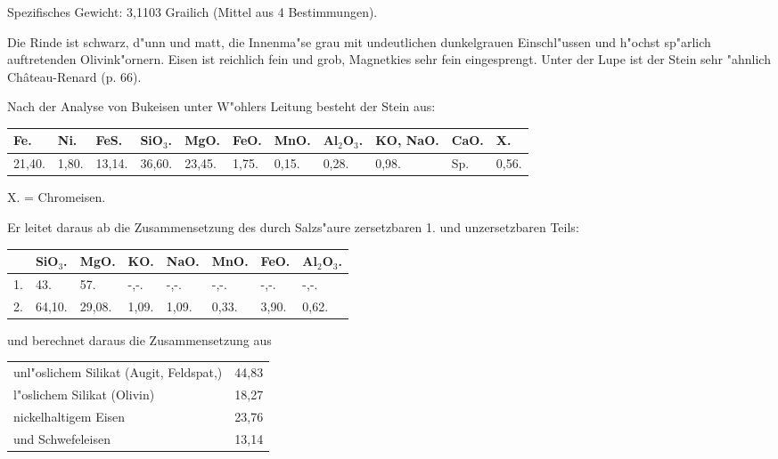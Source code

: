 \documentclass[a4paper, 11pt, oneside]{article}
\begin{document}
Spezifisches Gewicht: 3,1103 Grailich (Mittel aus 4 Bestimmungen).

Die Rinde ist schwarz, d"unn und matt, die Innenma"se grau mit undeutlichen dunkelgrauen Einschl"ussen und h"ochst sp"arlich auftretenden Olivink"ornern. Eisen ist reichlich fein und grob, Magnetkies sehr fein eingesprengt. Unter der Lupe ist der Stein sehr "ahnlich Château-Renard (p. 66).

Nach der Analyse von Bukeisen unter W"ohlers Leitung besteht der Stein aus:

\begin{table}[H]
    \centering\swabfamily\Large
    \normalsize
    \begin{tabular}{l p{4mm} l l l p{5mm} p{5mm} l l p{4mm} p{4mm}}
        Fe. & Ni. & FeS. & SiO$_{3}$. & MgO. & FeO. & MnO. & Al$_{2}$O$_{3}$. & KO, NaO. & CaO. & X. \\ \hline
        21,40. & 1,80. & 13,14. & 36,60. & 23,45. & 1,75. & 0,15. & 0,28. & 0,98. & Sp. & 0,56. \\
    \end{tabular}
\end{table}

X. = Chromeisen.

Er leitet daraus ab die Zusammensetzung des durch Salzs"aure zersetzbaren 1. und unzersetzbaren Teils:
\begin{table}[H]
    \centering\swabfamily\Large
    \begin{tabular}{l l l l l l l l}
         & SiO$_{3}$. & MgO. & KO. & NaO. & MnO. & FeO. & Al$_{2}$O$_{3}$. \\ \hline
        1. & 43. & 57. & -,-. & -,-. & -,-. & -,-. & -,-. \\
        2. & 64,10. & 29,08. & 1,09. & 1,09. & 0,33. & 3,90. & 0,62. \\
    \end{tabular}
\end{table}

und berechnet daraus die Zusammensetzung aus
\begin{table}[H]
    \centering\swabfamily\Large
    \begin{tabular}{l r}
    \hline
        unl"oslichem Silikat (Augit, Feldspat,) & 44,83 \\
        l"oslichem Silikat (Olivin) & 18,27 \\
        nickelhaltigem Eisen & 23,76 \\
        und Schwefeleisen & 13,14 \\
    \end{tabular}
\end{table}
\end{document}
